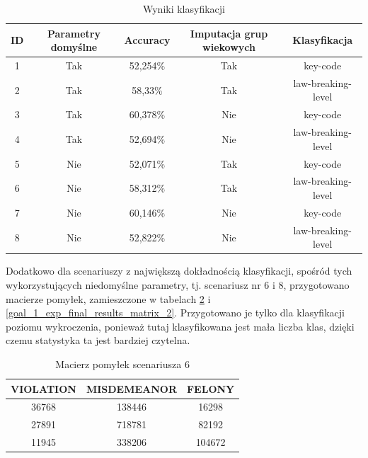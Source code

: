 \documentclass{classrep}
\begin{document}
{{{{                     \begin{table}
                     \small
                     \centering
                     \begin{tabular}{|c|c|c|c|c|}
                            \hline
                            ID & Parametry domyślne & Accuracy & Imputacja grup wiekowych & Klasyfikacja \\ \hline
                            1 & Tak  &  52,254\% & Tak & key-code\\ \hline
                            2 & Tak &  58,33\% & Tak & law-breaking-level\\ \hline
                            3 & Tak  &  60,378\% & Nie & key-code\\ \hline
                            4 & Tak &  52,694\% & Nie & law-breaking-level\\ \hline
                            5 & Nie  &  52,071\% & Tak & key-code\\ \hline
                            6 & Nie &  58,312\% & Tak & law-breaking-level\\ \hline
                            7 & Nie  &  60,146\% & Nie & key-code\\ \hline
                            8 & Nie &  52,822\% & Nie & law-breaking-level\\ \hline
                        \end{tabular}
                        \caption{Wyniki klasyfikacji}
                        \label{goal_1_exp_final_results}
                     \end{table}

                    Dodatkowo dla scenariuszy z największą dokładnością klasyfikacji,
                    spośród tych wykorzystujących niedomyślne parametry, tj. scenariusz
                    nr 6 i 8, przygotowano macierze pomyłek, zamieszczone w tabelach
                    \ref{goal_1_exp_final_results_matrix_1} i
                    \ref{goal_1_exp_final_results_matrix_2}. Przygotowano je tylko dla
                    klasyfikacji poziomu wykroczenia, ponieważ tutaj klasyfikowana jest
                    mała liczba klas, dzięki czemu statystyka ta jest bardziej czytelna.
                     
                     \begin{table}
                     \small
                     \centering
                     \begin{tabular}{|c|c|c|}
                            \hline
                            VIOLATION & MISDEMEANOR & FELONY\\ \hline
                           36768 & 138446 &  16298\\ \hline
                           27891 & 718781  & 82192\\ \hline
                           11945 & 338206 & 104672 \\ \hline
                        \end{tabular}
                        \caption{Macierz pomyłek scenariusza 6 }
                        \label{goal_1_exp_final_results_matrix_1}
                     \end{table}
                     
}}}}
\end{document}
